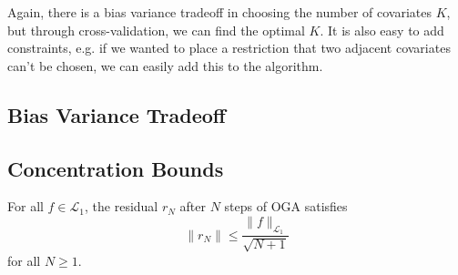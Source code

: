   Again, there is a bias variance tradeoff in choosing the number of covariates $K$, but through cross-validation, we can find the optimal $K$. It is also easy to add constraints, e.g. if we wanted to place a restriction that two adjacent covariates can't be chosen, we can easily add this to the algorithm. 

\subsection{Bias Variance Tradeoff}

\subsection{Concentration Bounds}

  \begin{theorem}
    For all $f \in \mathcal{L}_1$, the residual $r_N$ after $N$ steps of OGA satisfies
    \begin{equation}
      \|r_N\| \leq \frac{\|f\|_{\mathcal{L}_1}}{\sqrt{N + 1}} \tag{4}
    \end{equation}
    for all $N \geq 1$.
  \end{theorem}
